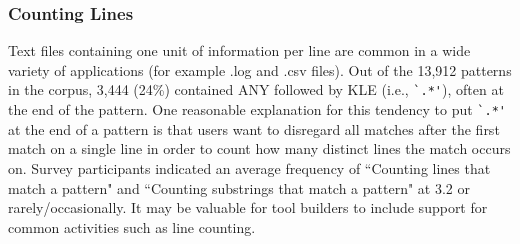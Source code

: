 
\subsubsection{Counting Lines}
Text files containing one unit of information per line are common in a wide variety of applications (for example .log and .csv files).  Out of the 13,912 patterns in the corpus, 3,444 (24\%) contained ANY followed by KLE  (i.e., \verb!`.*'!), often at the end of the pattern.
One reasonable explanation for this tendency to put \verb!`.*'! at the end of a pattern is that users want to disregard all matches after the first match on a single line in order to count how many distinct lines the match occurs on.  Survey participants indicated an average frequency of ``Counting lines that match a pattern" and ``Counting substrings that match a pattern" at 3.2 or rarely/occasionally. It may be valuable for tool builders to include support for common activities such as line counting.






